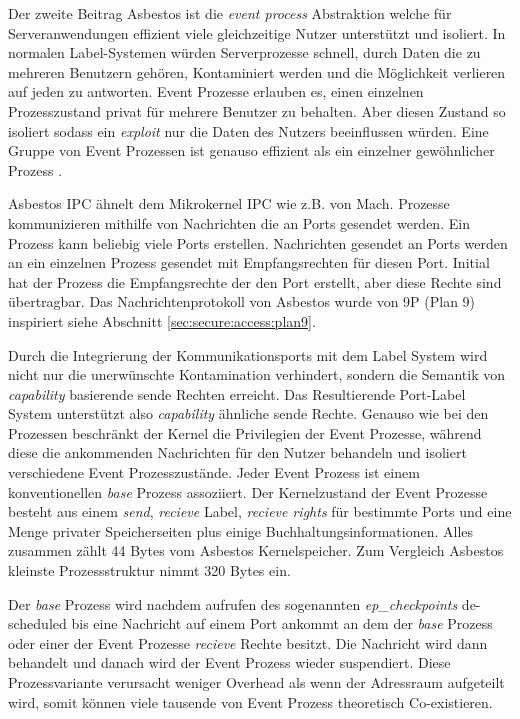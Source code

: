 \documentclass[11pt,technote]{IEEEtran}
\begin{document}
      Der zweite Beitrag Asbestos ist die \textit{event process} Abstraktion welche f\"ur Serveranwendungen 
      effizient viele gleichzeitige Nutzer unterst\"utzt und isoliert.
      In normalen Label-Systemen w\"urden Serverprozesse schnell, durch Daten die zu mehreren Benutzern geh\"oren, Kontaminiert werden und die 
      M\"oglichkeit verlieren auf jeden zu antworten. Event Prozesse erlauben es, einen einzelnen Prozesszustand privat f\"ur mehrere Benutzer zu behalten.
      Aber diesen Zustand so isoliert sodass ein \textit{exploit} nur die Daten des Nutzers beeinflussen w\"urden.
      Eine Gruppe von Event Prozessen ist genauso effizient als ein einzelner gew\"ohnlicher Prozess \cite[S. 1]{inproc:asbestos}.
      
      Asbestos IPC \"ahnelt dem Mikrokernel IPC wie z.B. von Mach. Prozesse kommunizieren mithilfe von Nachrichten die an Ports gesendet werden. Ein Prozess kann
      beliebig viele Ports erstellen. Nachrichten gesendet an Ports werden an ein einzelnen Prozess gesendet mit Empfangsrechten f\"ur diesen Port. 
      Initial hat der Prozess
      die Empfangsrechte der den Port erstellt, aber diese Rechte sind \"ubertragbar. Das Nachrichtenprotokoll von Asbestos wurde von 9P (Plan 9) inspiriert
      siehe Abschnitt \ref{sec:secure:access:plan9}.      
      
      Durch die Integrierung der Kommunikationsports mit dem Label System wird nicht nur die unerw\"unschte Kontamination verhindert, sondern die Semantik von
      \textit{capability} basierende sende Rechten erreicht. Das Resultierende Port-Label System unterst\"utzt also \textit{capability} \"ahnliche sende Rechte.
      Genauso wie bei den Prozessen beschr\"ankt der Kernel die Privilegien der Event Prozesse, w\"ahrend diese die ankommenden Nachrichten f\"ur den Nutzer
      behandeln und isoliert verschiedene Event Prozesszust\"ande.
      Jeder Event Prozess ist einem konventionellen \textit{base} Prozess assoziiert. Der Kernelzustand der Event Prozesse besteht aus einem \textit{send}, 
      \textit{recieve} Label, \textit{recieve rights} f\"ur bestimmte Ports und eine Menge privater Speicherseiten plus einige Buchhaltungsinformationen.
      Alles zusammen z\"ahlt 44 Bytes vom Asbestos Kernelspeicher. Zum Vergleich Asbestos kleinste Prozessstruktur nimmt 320 Bytes ein. 
      
      Der \textit{base} Prozess wird nachdem aufrufen des sogenannten \textit{ep\_checkpoints} de-scheduled bis eine Nachricht auf einem Port ankommt 
      an dem der \textit{base} Prozess oder einer der Event Prozesse \textit{recieve} Rechte besitzt.
      Die Nachricht wird dann behandelt und danach wird der Event Prozess wieder suspendiert. Diese Prozessvariante verursacht weniger Overhead als wenn der
      Adressraum aufgeteilt wird, somit k\"onnen viele tausende von Event Prozess theoretisch Co-existieren.
      
\end{document}
